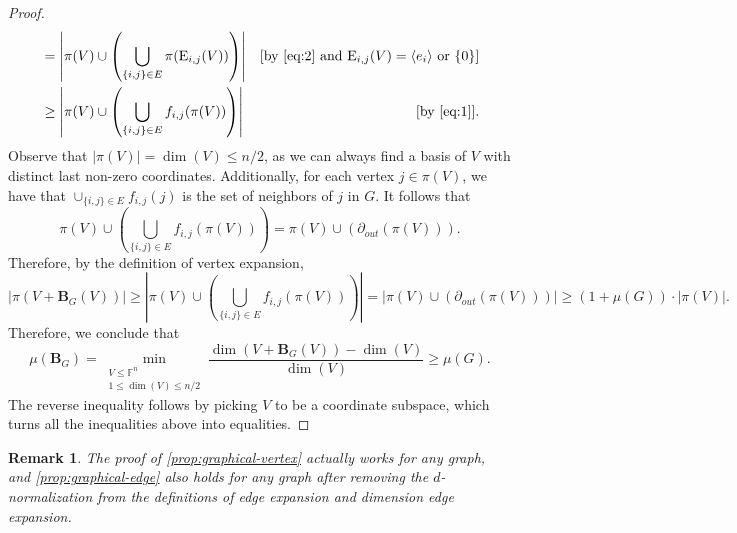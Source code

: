 \documentclass[11pt]{article}
\newtheorem{remark}[theorem]{Remark}
\theoremstyle{plain}
\numberwithin{equation}{section}
\theoremstyle{definition}
\newcommand{\F}{\mathbb{F}}
\newcommand{\tuple}[1]{\mathbf{#1}}
\newcommand{\vB}{\tuple{B}}
\newcommand{\E}{\mathrm{E}}
\begin{document}
\begin{proof}
\begin{align*}
        &=\left|\pi(V)\cup\left(\bigcup_{\{i,j\}\in E}\pi(\E_{i,j}(V))\right)\right|&[\text{by \eqref{eq:2} and }\E_{i,j}(V) = \langle e_i\rangle\text{ or }\{0\}]\\
        &\geq\left|\pi(V)\cup\left(\bigcup_{\{i,j\}\in E}f_{i,j}(\pi(V))\right)\right|&[\text{by \eqref{eq:1}}].
    \end{align*}
     Observe that $|\pi(V)|=\dim(V)\leq n/2$, as we can always find a basis of $V$ with distinct last non-zero coordinates. Additionally, for each vertex $j\in\pi(V)$, we have that $\cup_{\{i,j\}\in E}f_{i,j}(j)$ is the set of neighbors of $j$ in $G$. It follows that
     $$
     \pi(V)\cup\left(\bigcup_{\{i,j\}\in E}f_{i,j}(\pi(V))\right)=\pi(V)\cup\left(\partial_{out}(\pi(V))\right).
     $$
     Therefore, by the definition of vertex expansion,
     $$
    |\pi(V+\vB_G(V))|\geq \left|\pi(V)\cup\left(\bigcup_{\{i,j\}\in E}f_{i,j}(\pi(V))\right)\right|=\left|\pi(V)\cup\left(\partial_{out}(\pi(V))\right)\right|\geq (1+\mu(G))\cdot|\pi(V)|.
     $$
     Therefore, we conclude that
     \[
     \mu(\vB_G)=\min_{\substack{V\leq \F^n \\1\leq\dim(V)\leq n/2}} \frac{\dim(V+\vB_G(V))-\dim(V)}{\dim(V)}\geq \mu(G).
     \]
     The reverse inequality follows by picking $V$ to be a coordinate subspace, which turns all the inequalities above into equalities.
\end{proof}
\begin{remark}
  The proof of \cref{prop:graphical-vertex} actually works for any graph, and \cref{prop:graphical-edge} also holds for any graph after removing the $d$-normalization from the definitions of edge expansion and dimension edge expansion.
\end{remark}
\end{document}
